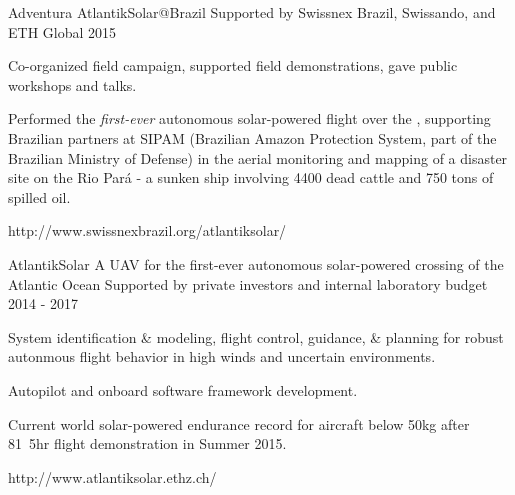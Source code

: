 \begin{cventries}
\cvprojwideentry
  	{Adventura AtlantikSolar@Brazil} %
  	{} %
    {Supported by Swissnex Brazil, Swissando, and ETH Global} %
    {2015} %
    {
      \begin{cvitems} %
        \item {Co-organized field campaign, supported field demonstrations, gave public workshops and talks.}
        \item {Performed the \emph{first-ever} autonomous solar-powered flight over the , supporting Brazilian partners at SIPAM (Brazilian Amazon Protection System, part of the Brazilian Ministry of Defense) in the aerial monitoring and mapping of a disaster site on the Rio Pará - a sunken ship involving 4400 dead cattle and 750 tons of spilled oil.}
      \end{cvitems}
    } %
    {http://www.swissnexbrazil.org/atlantiksolar/} %
    {\showprojectdescriptions}

\cvprojwideentry
  	{AtlantikSolar} %
  	{A UAV for the first-ever autonomous solar-powered crossing of the Atlantic Ocean} %
    {Supported by private investors and internal laboratory budget} %
    {2014 - 2017} %
    {
      \begin{cvitems} %
        \item {System identification \& modeling, flight control, guidance, \& planning for robust autonmous flight behavior in high winds and uncertain environments.}
        \item {Autopilot and onboard software framework development.}
        \item {Current world solar-powered endurance record for aircraft below \unit{50}{kg} after \unit{81.5}{hr} flight demonstration in Summer 2015.}
      \end{cvitems}
    } %
    {http://www.atlantiksolar.ethz.ch/} %
    {\showprojectdescriptions}


\end{cventries}

